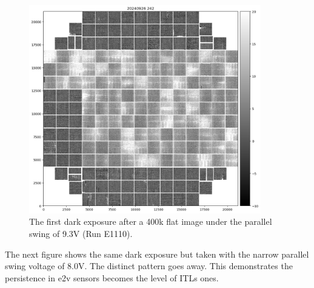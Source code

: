 \begin{figure}
\begin{centering}
\includegraphics[width=0.9\textwidth]{sections/figures/E1110dp93.png}
\end{centering}
\caption{The first dark exposure after a 400k flat image under the
parallel swing of 9.3V (Run E1110).}
\end{figure}

The next figure shows the same dark exposure but taken with the narrow
parallel swing voltage of 8.0V. The distinct pattern goes away. This
demonstrates the persistence in e2v sensors becomes the level of
ITL\textquotesingle s ones.

